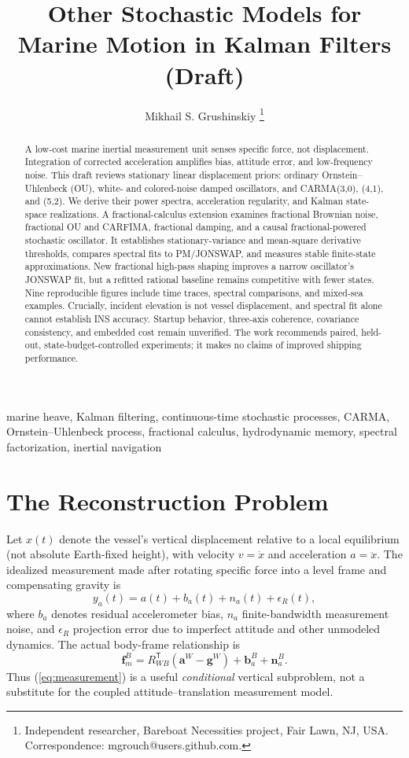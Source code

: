 \documentclass[10pt,journal]{IEEEtran}
\title{Other Stochastic Models for Marine Motion in Kalman Filters (Draft)}
\author{Mikhail S. Grushinskiy%
\thanks{Independent researcher, Bareboat Necessities project, Fair Lawn, NJ, USA.
Correspondence: mgrouch@users.github.com.}}
\begin{document}
\maketitle

\begin{abstract}
A low-cost marine inertial measurement unit senses specific force, not
displacement. Integration of corrected acceleration amplifies bias,
attitude error, and low-frequency noise. This draft reviews stationary
linear displacement priors: ordinary Ornstein--Uhlenbeck (OU),
white- and colored-noise damped oscillators, and
CARMA(3,0), (4,1), and (5,2). We derive their power spectra,
acceleration regularity, and Kalman state-space realizations.
A fractional-calculus extension examines fractional Brownian
noise, fractional OU and CARFIMA, fractional damping, and
a causal fractional-powered stochastic oscillator. It establishes
stationary-variance and mean-square derivative thresholds,
compares spectral fits to PM/JONSWAP, and measures stable finite-state
approximations. New fractional high-pass shaping improves a narrow
oscillator's JONSWAP fit, but a refitted rational baseline remains
competitive with fewer states. Nine reproducible figures include
time traces, spectral comparisons, and mixed-sea examples. Crucially, incident
elevation is not vessel displacement, and spectral fit alone cannot
establish INS accuracy. Startup behavior, three-axis coherence,
covariance consistency, and embedded cost remain unverified.
The work recommends paired, held-out, state-budget-controlled
experiments; it makes no claims of improved shipping performance.
\end{abstract}

\begin{IEEEkeywords}
marine heave, Kalman filtering, continuous-time stochastic processes,
CARMA, Ornstein--Uhlenbeck process, fractional calculus,
hydrodynamic memory, spectral factorization, inertial navigation
\end{IEEEkeywords}

\section{The Reconstruction Problem}
Let \(x(t)\) denote the vessel's vertical displacement relative to a
local equilibrium (not absolute Earth-fixed height), with velocity \(v=\dot x\)
and acceleration \(a=\ddot x\). The idealized measurement made after rotating
specific force into a level frame and compensating gravity is
\begin{equation}
y_a(t)=a(t)+b_a(t)+n_a(t)+\epsilon_R(t),
\label{eq:measurement}
\end{equation}
where \(b_a\) denotes residual accelerometer bias, \(n_a\) finite-bandwidth
measurement noise, and \(\epsilon_R\) projection error due to imperfect
attitude and other unmodeled dynamics. The actual body-frame relationship is
\begin{equation}
\mathbf f_m^B=R_{WB}^{\mathsf T}
  (\mathbf a^W-\mathbf g^W)+\mathbf b_a^B+\mathbf n_a^B.
\label{eq:body-meas}
\end{equation}
Thus (\ref{eq:measurement}) is a useful \emph{conditional} vertical subproblem,
not a substitute for the coupled attitude--translation measurement model.
\end{document}
